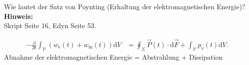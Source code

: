 \begin{question}[section=2,name={Poynting 1},difficulty=,quantity=1,type=thr,tags={20151210,20130625}]
Wie lautet der Satz von Poynting (Erhaltung der elektromagnetischen Energie)?
\\ \textbf{Hinweis:}\\
Skript Seite 16, Edyn Seite 53.
\end{question}
\begin{solution}
	\begin{align}
	-\frac{\partial}{\partial t} \int_\mathcal{V} (w_\mathrm{e}(t) + w_\mathrm{m}(t) ) \mathrm dV &= \oint_\Sigma \vec{P}(t) \cdot \mathrm d \vec{F} + \int_\mathcal{V} p_\mathrm{v} (t) \mathrm dV.
\end{align}
Abnahme der elektromagnetischen Energie = Abstrahlung + Dissipation
\end{solution}